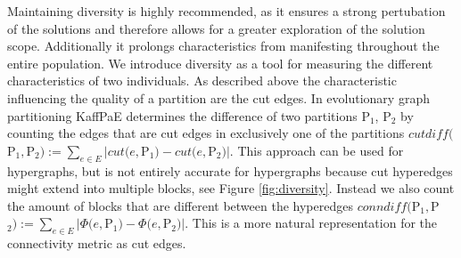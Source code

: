 \documentclass[a4paper,12pt,titlepage, BCOR7mm,headsepline]{scrbook}
\numberwithin{equation}{section}
\begin{document}
Maintaining diversity is highly recommended\cite{back1996evolutionary}, as it ensures a strong pertubation of the solutions and therefore allows for a greater exploration of the solution scope.
Additionally it prolongs characteristics from manifesting throughout the entire population.
We introduce diversity as a tool for measuring the different characteristics of two individuals. 
As described above the characteristic influencing the quality of a partition are the cut edges. In evolutionary graph partitioning KaffPaE \cite{sanders2012distributed} determines the difference of two partitions P$_1$, P$_2$ by counting the edges that are cut edges in exclusively one of the partitions $cutdiff($P$_1,$P$_2) :=\sum_{e \in E} |cut(e,$P$_1) - cut(e,$P$_2)|$. This approach can be used for hypergraphs, but is not entirely accurate for hypergraphs because cut hyperedges might extend into multiple blocks, see Figure \ref{fig:diversity}. Instead we also count the amount of blocks that are different between the hyperedges $conndiff($P$_1,$P$_2) :=\sum_{e \in E} |\Phi(e,$P$_1) - \Phi(e,$P$_2)|$. This is a more natural representation for the connectivity metric as cut edges.
\end{document}
